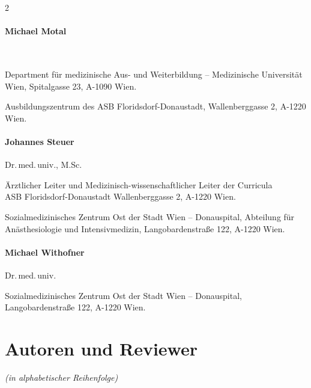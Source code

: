 \documentclass[
ngerman,
paper=a4,
asymmetric,
fontsize=9pt,
headings=small,
draft=false,
parskip=false,
footnotes=multiple,
]{scrbook}
\begin{document}
\begin{multicols}{2}
    \paragraph{Michael Motal}~
    
    Department für medizinische Aus- und Weiterbildung -- Medizinische
    Universität Wien,   
    Spitalgasse 23, A-1090 Wien.
    
    Ausbildungszentrum des ASB Floridsdorf-Donaustadt,
    Wallenberggasse 2, A-1220 Wien.
    
    \paragraph{Johannes Steuer}
    Dr.\,med.\,univ., M.Sc.
    
    Ärztlicher Leiter und Medizinisch-wissenschaftlicher Leiter der
    Curricula\\    
    ASB Floridsdorf-Donaustadt
    Wallenberggasse 2, A-1220 Wien.
    
    Sozialmedizinisches Zentrum Ost der Stadt Wien -- Donauspital,
    Abteilung für Anästhesiologie und Intensivmedizin,
    Langobardenstra{\ss}e 122, A-1220 Wien.
    
    \paragraph{Michael Withofner}
    Dr.\,med.\,univ.
    
    Sozialmedizinisches Zentrum Ost der Stadt Wien -- Donauspital, 
    Langobardenstra{\ss}e 122, A-1220 Wien.
    
\end{multicols}

\section*{Autoren und Reviewer}



\emph{\tiny{(in alphabetischer Reihenfolge)}}
\end{document}
